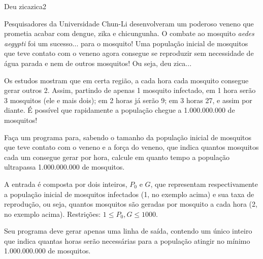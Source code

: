 \documentclass[12pt,a4paper,oneside]{article}
\begin{document}
\begin{problem}{Deu zica}{zica}{2}
 
Pesquisadores da Universidade Chun-Li desenvolveram um poderoso veneno que prometia acabar com dengue, zika e chicungunha. O combate ao mosquito \textit{aedes aegypti} foi um sucesso... para o mosquito! Uma população inicial de mosquitos que teve contato com o veneno agora consegue se reproduzir sem necessidade de água parada e nem de outros mosquitos! Ou seja, deu zica...

Os estudos mostram que em certa região, a cada hora cada mosquito consegue gerar outros 2. Assim, partindo de apenas 1 mosquito infectado, em 1 hora serão 3 mosquitos (ele e mais dois); em 2 horas já serão 9; em 3 horas 27, e assim por diante. É possível que rapidamente a população chegue a 1.000.000.000 de mosquitos!

Faça um programa para, sabendo o tamanho da população inicial de mosquitos que teve contato com o veneno e a força do veneno, que indica quantos mosquitos cada um consegue gerar por hora, calcule em quanto tempo a população ultrapassa 1.000.000.000 de mosquitos.

%

\InputFile

A entrada é composta por dois inteiros, $P_0$ e $G$, que representam respectivamente a população inicial de mosquitos infectados (1, no exemplo acima) e sua taxa de reprodução, ou seja, quantos mosquitos são geradas por mosquito a cada hora (2, no exemplo acima). Restrições: $1 \leq P_0, G \leq 1000$.


\OutputFile

Seu programa deve gerar apenas uma linha de saída, contendo um único inteiro que indica quantas horas serão necessárias para a população atingir no mínimo 1.000.000.000 de mosquitos.

\Example

\begin{example}
%
\end{example}

\begin{example}
%
\end{example}

\begin{example}
%
\end{example}

\begin{example}
%
\end{example}


\end{problem}
\end{document}
